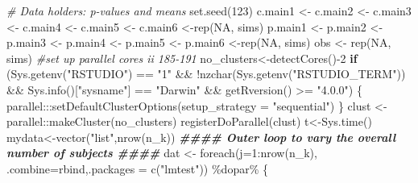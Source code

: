 \documentclass[
]{article}
\newenvironment{Shaded}{\begin{snugshade}}{\end{snugshade}}
\newcommand{\AttributeTok}[1]{\textcolor[rgb]{0.77,0.63,0.00}{#1}}
\newcommand{\CommentTok}[1]{\textcolor[rgb]{0.56,0.35,0.01}{\textit{#1}}}
\newcommand{\ConstantTok}[1]{\textcolor[rgb]{0.00,0.00,0.00}{#1}}
\newcommand{\ControlFlowTok}[1]{\textcolor[rgb]{0.13,0.29,0.53}{\textbf{#1}}}
\newcommand{\DecValTok}[1]{\textcolor[rgb]{0.00,0.00,0.81}{#1}}
\newcommand{\DocumentationTok}[1]{\textcolor[rgb]{0.56,0.35,0.01}{\textbf{\textit{#1}}}}
\newcommand{\FunctionTok}[1]{\textcolor[rgb]{0.00,0.00,0.00}{#1}}
\newcommand{\NormalTok}[1]{#1}
\newcommand{\OtherTok}[1]{\textcolor[rgb]{0.56,0.35,0.01}{#1}}
\newcommand{\SpecialCharTok}[1]{\textcolor[rgb]{0.00,0.00,0.00}{#1}}
\newcommand{\StringTok}[1]{\textcolor[rgb]{0.31,0.60,0.02}{#1}}
\begin{document}
\begin{Shaded}
\begin{Highlighting}[]
\CommentTok{\# Data holders: p{-}values and means}
\FunctionTok{set.seed}\NormalTok{(}\DecValTok{123}\NormalTok{)}
\NormalTok{c.main1 }\OtherTok{\textless{}{-}}\NormalTok{ c.main2 }\OtherTok{\textless{}{-}}\NormalTok{ c.main3 }\OtherTok{\textless{}{-}}\NormalTok{ c.main4 }\OtherTok{\textless{}{-}}\NormalTok{ c.main5 }\OtherTok{\textless{}{-}}\NormalTok{ c.main6 }\OtherTok{\textless{}{-}}\FunctionTok{rep}\NormalTok{(}\ConstantTok{NA}\NormalTok{, sims)}
\NormalTok{p.main1 }\OtherTok{\textless{}{-}}\NormalTok{ p.main2 }\OtherTok{\textless{}{-}}\NormalTok{ p.main3 }\OtherTok{\textless{}{-}}\NormalTok{ p.main4 }\OtherTok{\textless{}{-}}\NormalTok{ p.main5 }\OtherTok{\textless{}{-}}\NormalTok{ p.main6 }\OtherTok{\textless{}{-}}\FunctionTok{rep}\NormalTok{(}\ConstantTok{NA}\NormalTok{, sims)}
\NormalTok{obs }\OtherTok{\textless{}{-}} \FunctionTok{rep}\NormalTok{(}\ConstantTok{NA}\NormalTok{, sims)}
\CommentTok{\#set up parallel cores ii 185{-}191}
\NormalTok{no\_clusters}\OtherTok{\textless{}{-}}\FunctionTok{detectCores}\NormalTok{()}\SpecialCharTok{{-}}\DecValTok{2}
\ControlFlowTok{if}\NormalTok{ (}\FunctionTok{Sys.getenv}\NormalTok{(}\StringTok{"RSTUDIO"}\NormalTok{) }\SpecialCharTok{==} \StringTok{"1"} \SpecialCharTok{\&\&} \SpecialCharTok{!}\FunctionTok{nzchar}\NormalTok{(}\FunctionTok{Sys.getenv}\NormalTok{(}\StringTok{"RSTUDIO\_TERM"}\NormalTok{)) }\SpecialCharTok{\&\&} 
    \FunctionTok{Sys.info}\NormalTok{()[}\StringTok{"sysname"}\NormalTok{] }\SpecialCharTok{==} \StringTok{"Darwin"} \SpecialCharTok{\&\&} \FunctionTok{getRversion}\NormalTok{() }\SpecialCharTok{\textgreater{}=} \StringTok{"4.0.0"}\NormalTok{) \{}
\NormalTok{  parallel}\SpecialCharTok{:::}\FunctionTok{setDefaultClusterOptions}\NormalTok{(}\AttributeTok{setup\_strategy =} \StringTok{"sequential"}\NormalTok{)}
\NormalTok{\}}
\NormalTok{clust }\OtherTok{\textless{}{-}}\NormalTok{ parallel}\SpecialCharTok{::}\FunctionTok{makeCluster}\NormalTok{(no\_clusters)}
\FunctionTok{registerDoParallel}\NormalTok{(clust)}
\NormalTok{t}\OtherTok{\textless{}{-}}\FunctionTok{Sys.time}\NormalTok{()}
\NormalTok{mydata}\OtherTok{\textless{}{-}}\FunctionTok{vector}\NormalTok{(}\StringTok{"list"}\NormalTok{,}\FunctionTok{nrow}\NormalTok{(n\_k))}
\DocumentationTok{\#\#\#\# Outer loop to vary the overall number of subjects \#\#\#\#}
\NormalTok{dat }\OtherTok{\textless{}{-}} \FunctionTok{foreach}\NormalTok{(}\AttributeTok{j=}\DecValTok{1}\SpecialCharTok{:}\FunctionTok{nrow}\NormalTok{(n\_k), }\AttributeTok{.combine=}\NormalTok{rbind,}\AttributeTok{.packages =} \FunctionTok{c}\NormalTok{(}\StringTok{"lmtest"}\NormalTok{)) }\SpecialCharTok{\%dopar\%}\NormalTok{ \{}

\end{Highlighting}
\end{Shaded}
\end{document}
